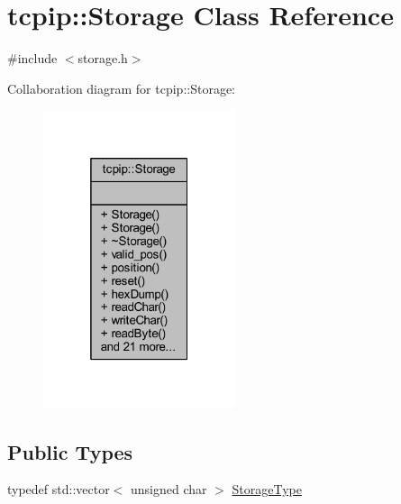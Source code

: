 \hypertarget{classtcpip_1_1_storage}{}\section{tcpip\+:\+:Storage Class Reference}
\label{classtcpip_1_1_storage}


{\ttfamily \#include $<$storage.\+h$>$}



Collaboration diagram for tcpip\+:\+:Storage\+:
\nopagebreak
\begin{figure}[H]
\begin{center}
\leavevmode
\includegraphics[width=160pt]{classtcpip_1_1_storage__coll__graph}
\end{center}
\end{figure}
\subsection*{Public Types}
\begin{DoxyCompactItemize}
\item 
typedef std\+::vector$<$ unsigned char $>$ \hyperlink{classtcpip_1_1_storage_a087e7b1151a2642cb782b5a6bdc25576}{Storage\+Type}
\end{DoxyCompactItemize}
